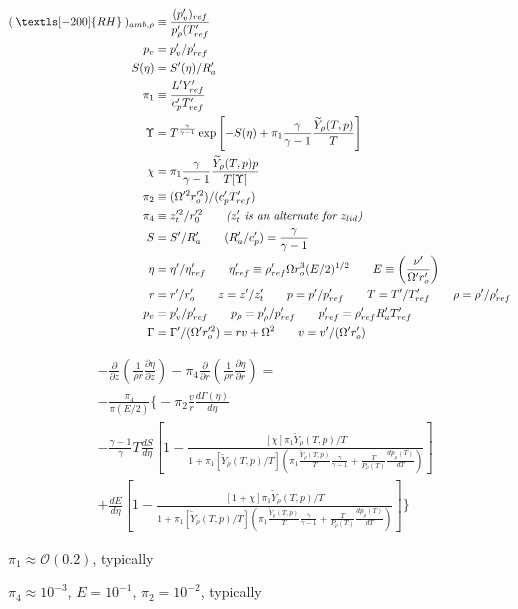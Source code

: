 \documentclass[preprint, prX]{revtex4}
\newcommand{\gogmo}{\frac{\gamma}{\gamma-1}}
\newcommand{\pfrac}[2]{\left(\frac{#1}{#2}\right)}
\newcommand{\dd}[2]{\frac{d#1}{d#2}}
\newcommand{\pd}[2]{\frac{\partial#1}{\partial#2}}
\newcommand{\rh}{\:\textls[-200]{RH}\:}
\begin{document}
\begin{itemize}
\begin{equation}
\begin{split}
(\rh)_{amb,\rho} &\equiv \frac{(p_v')_{ref}}{p_\rho'(T_{ref}'}\\
p_v &= p_v' / p_{ref}' \\
S(\eta) &= S'(\eta)/R_a' \\
\pi_1 &\equiv \frac{L'Y_{ref}'}{c_p' T_{ref}'} \\
\Upsilon &= T^\gogmo \exp\left[ -S(\eta) + \pi_1 \gogmo \frac{\widetilde{Y}_\rho(T,p)}{T}\right] \\
\chi &= \pi_1 \gogmo \frac{\widetilde{Y}_\rho(T,p) p}{T[\Upsilon]} \\
\pi_2 &\equiv (\Omega'^2 r_o'^2)/(c_p'T_{ref}') \\
\pi_4 &\equiv z_t'^2 / r_0'^2 \qquad \textit{($z_t'$ is an alternate for $z_{lid}$)} \\
S &= S'/R_a' \qquad (R_a'/c_p') = \gogmo \\
\eta &= \eta'/\eta_{ref}' \qquad \eta_{ref}' \equiv \rho_{ref}'\Omega r_o^3 (E/2)^{1/2} \qquad E \equiv \pfrac{\nu'}{\Omega' r_o'}\\
r &= r'/r_o' \qquad z= z'/z_t' \qquad p= p'/p_{ref}' \qquad T=T'/T_{ref}' \qquad \rho = \rho'/\rho_{ref}' \\
p_v &= p_v'/p_{ref}' \qquad p_\rho= p_\rho'/p_{ref}' \qquad p_{ref}' = \rho_{ref}'R_a'T_{ref}' \\
\Gamma &= \Gamma'/(\Omega'r_o'^2) = r v + \Omega^2 \qquad v = v'/(\Omega' r_o') 
\end{split}
\end{equation}

\begin{equation}
\begin{split}
&-\pd{}{z} \left( \frac{1}{\rho r}\pd{\eta}{z} \right) - \pi_4 \pd{}{r} \left( \frac{1}{\rho r}\pd{\eta}{r} \right) = \\
&-\frac{\pi_4}{\pi(E/2)} \Bigg\{- \pi_2 \frac{v}{r}\dd{\Gamma(\eta)}{\eta} \\
&-\frac{\gamma -1}{\gamma}T \dd{S}{\eta}\left[ 1- \frac{[\chi]\pi_1 \widetilde{Y}_\rho(T,p)/T}{1+\pi_1[\widetilde{Y}_\rho(T,p)/T]\left( \pi_1 \frac{\widetilde{Y}_\rho(T,p)}{T}\gogmo + \frac{T}{P_\rho(T)}\dd{p_\rho(T)}{T}\right)}\right] \\
&+ \dd{E}{\eta}\left[ 1- \frac{[1+\chi]\pi_1 \widetilde{Y}_\rho(T,p)/T}{1+\pi_1[\widetilde{Y}_\rho(T,p)/T]\left( \pi_1 \frac{\widetilde{Y}_\rho(T,p)}{T}\gogmo + \frac{T}{P_\rho(T)}\dd{p_\rho(T)}{T}\right)}\right] 
\Bigg\}
\end{split}
\end{equation}

$\pi_1 \approx \mathcal{O}(0.2)$, typically

$\pi_4 \approx 10^{-3}$, $E=10^{-1}$, $\pi_2 = 10^{-2}$, typically

\end{itemize}
\end{document}
